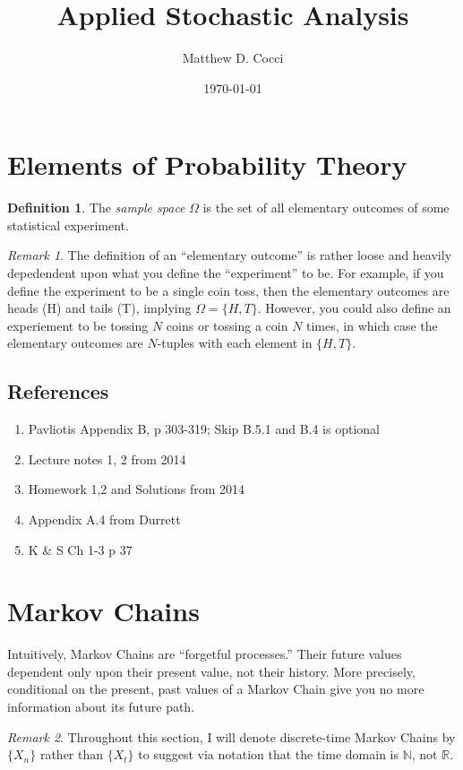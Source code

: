 \documentclass[12pt]{article}
\author{Matthew D. Cocci}
\title{Applied Stochastic Analysis}
\date{\today}
\theoremstyle{plain}
\theoremstyle{definition}
\newtheorem{defn}[thm]{Definition}
\theoremstyle{remark}
\newtheorem*{rmk}{Remark}
\begin{document}
\maketitle

\tableofcontents

\clearpage
\section{Elements of Probability Theory}

\begin{defn}
The \emph{sample space} $\Omega$ is the set of all elementary outcomes
of some statistical experiment.
\end{defn}
\begin{rmk}
The definition of an ``elementary outcome'' is rather loose and heavily
depedendent upon what you define the ``experiment'' to be. For example,
if you define the experiment to be a single coin toss, then the
elementary outcomes are heads (H) and tails (T), implying $\Omega =
\{H,T\}$. However, you could also define an experiement to be tossing
$N$ coins or tossing a coin $N$ times, in which case the elementary
outcomes are $N$-tuples with each element in $\{H,T\}$.
\end{rmk}

\subsection{References}
\begin{enumerate}
  \item Pavliotis Appendix B, p 303-319; Skip B.5.1 and B.4 is optional
  \item Lecture notes 1, 2 from 2014
  \item Homework 1,2 and Solutions from 2014
  \item Appendix A.4 from Durrett
  \item K \& S Ch 1-3 p 37
\end{enumerate}

\section{Markov Chains}

Intuitively, Markov Chains are ``forgetful processes.'' Their future
values dependent only upon their present value, not their history. More
precisely, conditional on the present, past values of a Markov Chain
give you no more information about its future path.
\begin{rmk}
  Throughout this section, I will denote discrete-time Markov Chains by
  $\{X_n\}$ rather than $\{X_t\}$ to suggest via notation that the time
  domain is $\mathbb{N}$,
not $\mathbb{R}$.
\end{rmk}
\end{document}
